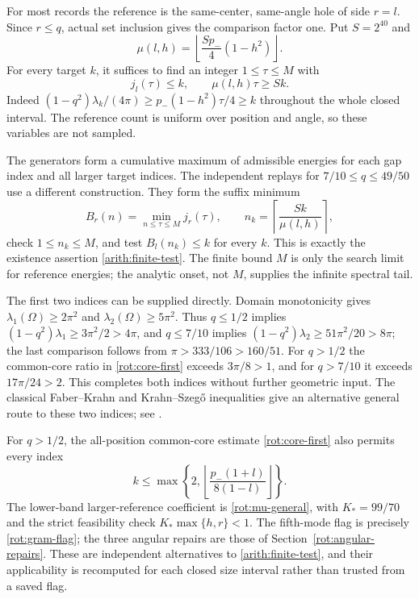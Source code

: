 \documentclass[11pt,reqno]{amsart}
\numberwithin{equation}{section}
\begin{document}
For most records the reference is the same-center, same-angle hole
of side $r=l$.  Since $r\le q$, actual set inclusion gives the
comparison factor one.  Put $S=2^{40}$ and
\begin{equation}\label{arith:mu}
 \mu(l,h)=\left\lfloor\frac{S p_-}{4}(1-h^2)\right\rfloor.
\end{equation}
For every target $k$, it suffices to find an integer $1\le\tau\le M$
with
\begin{equation}\label{arith:finite-test}
 j_l(\tau)\le k,\qquad \mu(l,h)\tau\ge S k.
\end{equation}
Indeed $(1-q^2)\lambda_k/(4\pi)\ge
p_-(1-h^2)\tau/4\ge k$ throughout the whole closed interval.
The reference count is uniform over position and angle, so these
variables are not sampled.

The generators form a cumulative maximum of admissible energies for
each gap index and all larger target indices.  The independent replays
for $7/10\le q\le49/50$ use a different construction.  They form
the suffix minimum
\[
 B_r(n)=\min_{n\le\tau\le M}j_r(\tau),
 \qquad n_k=\left\lceil\frac{S k}{\mu(l,h)}\right\rceil,
\]
check $1\le n_k\le M$, and test $B_l(n_k)\le k$ for every $k$.
This is exactly the existence assertion \eqref{arith:finite-test}.
The finite bound $M$ is only the search limit for reference energies;
the analytic onset, not $M$, supplies the infinite spectral tail.

The first two indices can be supplied directly. Domain monotonicity
gives $\lambda_1(\Omega)\ge2\pi^2$ and
$\lambda_2(\Omega)\ge5\pi^2$. Thus $q\le1/2$ implies
$(1-q^2)\lambda_1\ge3\pi^2/2>4\pi$, and $q\le7/10$ implies
$(1-q^2)\lambda_2\ge51\pi^2/20>8\pi$; the last comparison follows
from $\pi>333/106>160/51$. For $q>1/2$ the common-core ratio in
\eqref{rot:core-first} exceeds $3\pi/8>1$, and for $q>7/10$ it
exceeds $17\pi/24>2$. This completes both indices without further
geometric input. The classical Faber--Krahn and Krahn--Szeg\H{o}
inequalities give an alternative general route to these two indices;
see \cite{Henrot2006}.

For $q>1/2$, the all-position common-core estimate
\eqref{rot:core-first} also permits every index
\begin{equation}\label{arith:core-bypass}
 k\le\max\left\{2,
   \left\lfloor\frac{p_-(1+l)}{8(1-l)}\right\rfloor\right\}.
\end{equation}
The lower-band larger-reference coefficient is \eqref{rot:mu-general},
with $K_*=99/70$ and the strict feasibility check
$K_*\max\{h,r\}<1$.  The fifth-mode flag is precisely
\eqref{rot:gram-flag}; the three angular repairs are those of
Section~\ref{rot:angular-repairs}.  These are independent alternatives
to \eqref{arith:finite-test}, and their applicability is recomputed
for each closed size interval rather than trusted from a saved flag.
\end{document}
